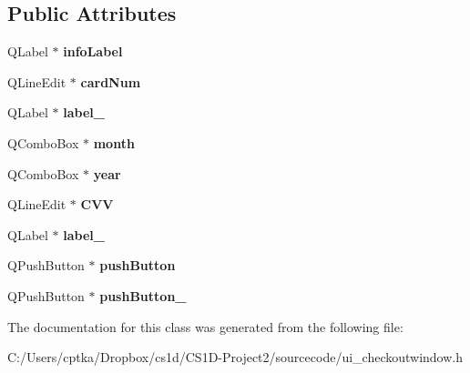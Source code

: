 \subsection*{Public Attributes}
\begin{DoxyCompactItemize}
\item 
\mbox{\label{class_ui___checkout_window_a16e806d0d1dfbe91d9c587e74ae779b2}} 
Q\+Label $\ast$ {\bfseries info\+Label}
\item 
\mbox{\label{class_ui___checkout_window_a700a00c5fb01e2e765fdfb69e4f37db0}} 
Q\+Line\+Edit $\ast$ {\bfseries card\+Num}
\item 
\mbox{\label{class_ui___checkout_window_a04080e7005b381f952831c2cb19607ff}} 
Q\+Label $\ast$ {\bfseries label\+\_}
\item 
\mbox{\label{class_ui___checkout_window_abbbfa64f1df7637a048346f3f378f576}} 
Q\+Combo\+Box $\ast$ {\bfseries month}
\item 
\mbox{\label{class_ui___checkout_window_aeafbaa39ed38da88a2d670d0ffcac02f}} 
Q\+Combo\+Box $\ast$ {\bfseries year}
\item 
\mbox{\label{class_ui___checkout_window_aedba99e9692bfc6cfc12471268610996}} 
Q\+Line\+Edit $\ast$ {\bfseries C\+VV}
\item 
\mbox{\label{class_ui___checkout_window_a48cd1d8c2c3b0421ade0cf14fc2ab0d9}} 
Q\+Label $\ast$ {\bfseries label\+\_}
\item 
\mbox{\label{class_ui___checkout_window_a584353a58c94165df30991df4b568ee1}} 
Q\+Push\+Button $\ast$ {\bfseries push\+Button}
\item 
\mbox{\label{class_ui___checkout_window_a2f25585d6f8527481b9d813edf14b672}} 
Q\+Push\+Button $\ast$ {\bfseries push\+Button\+\_}
\end{DoxyCompactItemize}


The documentation for this class was generated from the following file\+:\begin{DoxyCompactItemize}
\item 
C\+:/\+Users/cptka/\+Dropbox/cs1d/\+C\+S1\+D-\/\+Project2/sourcecode/ui\+\_\+checkoutwindow.\+h\end{DoxyCompactItemize}
